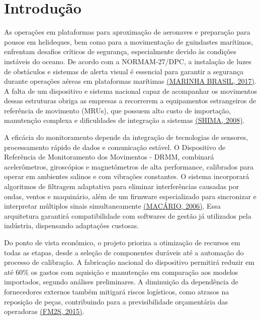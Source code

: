 \documentclass[a4paper, 12pt]{article}
\makeatletter
\renewcommand\tableofcontents{%
    \centering
    \section*{\contentsname
        \@mkboth{%
           \MakeUppercase\contentsname}{\MakeUppercase\contentsname}}%
    \@starttoc{toc}%
    }
\makeatother
\begin{document}

\pagestyle{modeloTexto}


\newpage
\tableofcontents
\newpage
\listoffigures
\listoftables
\newpage
\raggedright
\justifying
\normalsize


\newpage
\section{Introdução}
    As operações em plataformas para aproximação de aeronaves e preparação para pousos em helideques, bem como para a movimentação de guindastes marítimos, enfrentam desafios críticos de segurança, especialmente devido às condições instáveis do oceano. De acordo com a NORMAM-27/DPC, a instalação de luzes de obstáculos e sistemas de alerta visual é essencial para garantir a segurança durante operações aéreas em plataformas marítimas \hyperlink{MARINHA}{(MARINHA BRASIL, 2017)}. A falta de um dispositivo e sistema nacional capaz de acompanhar os movimentos dessas estruturas obriga as empresas a recorrerem a equipamentos estrangeiros de referência de movimento (MRUs), que possuem alto custo de importação, manutenção complexa e dificuldades de integração a sistemas \hyperlink{ORTIZNETO}{(SHIMA, 2008)}. 

    A eficácia do monitoramento depende da integração de tecnologias de sensores, processamento rápido de dados e comunicação estável. O Dispositivo de Referência de Monitoramento dos Movimentos - DRMM, combinará acelerômetros, giroscópios e magnetômetros de alta performance, calibrados para operar em ambientes salinos e com vibrações constantes. O sistema incorporará algoritmos de filtragem adaptativa para eliminar interferências causadas por ondas, ventos e maquinário, além de um firmware especializado para sincronizar e interpretar múltiplos sinais simultaneamente \hyperlink{MACARIO}{(MACÁRIO, 2006)}. Essa arquitetura garantirá compatibilidade com softwares de gestão já utilizados pela indústria, dispensando adaptações custosas.
    
    Do ponto de vista econômico, o projeto prioriza a otimização de recursos em todas as etapas, desde a seleção de componentes duráveis até a automação do processo de calibração. A fabricação nacional do dispositivo permitirá reduzir em até 60\% os gastos com aquisição e manutenção em comparação aos modelos importados, segundo análises preliminares. A diminuição da dependência de fornecedores externos também mitigará riscos logísticos, como atrasos na reposição de peças, contribuindo para a previsibilidade orçamentária das operadoras \hyperlink{FM2S}{(FM2S, 2015)}.
    
\end{document}
